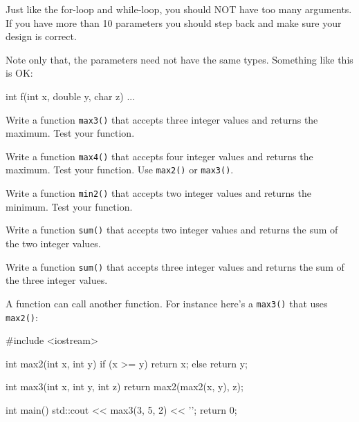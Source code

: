 Just like the for-loop and while-loop, you should NOT have too many arguments. If you have more than 10 parameters you should step back and make sure your design is correct.

Note only that, the parameters need not have the same types. Something like this is OK:

\begin{consolethree}[escapeinside=||]
int f(int x, double y, char z)
{
    ...
}
\end{consolethree}


\newpage{}

\begin{ex}
Write a function \texttt{max3()} that accepts three integer values and returns the maximum. Test your function.
\end{ex}

\begin{ex}
Write a function \texttt{max4()} that accepts four integer values and returns the maximum. Test your function. Use \texttt{max2()} or \texttt{max3()}.
\end{ex}

\begin{ex}
Write a function \texttt{min2()} that accepts two integer values and returns the minimum. Test your function.
\end{ex}

\begin{ex}
Write a function \texttt{sum()} that accepts two integer values and returns the sum of the two integer values.
\end{ex}

\begin{ex}
Write a function \texttt{sum()} that accepts three integer values and returns the sum of the three integer values.
\end{ex}


\newpage{}

A function can call another function. For instance here's a \texttt{max3()} that uses \texttt{max2()}:

\begin{consolethree}[escapeinside=||]
#include <iostream>

int max2(int x, int y)
{
    if (x >= y)
    {
        return x;
    }
    else
    {
        return y;
    }
}

int max3(int x, int y, int z)
{
    return max2(max2(x, y), z);
}

int main()
{
    std::cout << max3(3, 5, 2) << '\n';
    return 0;
}
\end{consolethree}

